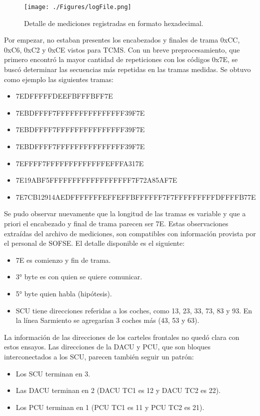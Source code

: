 \begin{figure}[H]
	\centering
	\texttt{[image: ./Figures/logFile.png]}
	\caption{Detalle de mediciones registradas en formato hexadecimal.}
	\label{fig:logFile}
\end{figure}

Por empezar, no estaban presentes los encabezados y finales de trama 0xCC, 0xC6, 0xC2 y 0xCE vistos para TCMS. Con un breve preprocesamiento, que primero encontró la mayor cantidad de repeticiones con los códigos 0x7E, se buscó determinar las secuencias más repetidas en las tramas medidas. Se obtuvo como ejemplo las siguientes tramas:

\begin{itemize}
\item 7EDFFFFFDEEFBFFFBFF7E
\item 7EBDFFFF7FFFFFFFFFFFFFFF39F7E
\item 7EBDFFFF7FFFFFFFFFFFFFFF39F7E
\item 7EBDFFFF7FFFFFFFFFFFFFFF39F7E
\item 7EFFFF7FFFFFFFFFFFFFEFFFA317E
\item 7E19ABF5FFFFFFFFFFFFFFFFFF7F72A85AF7E
\item 7E7CB12914AEDFFFFFFFEFFEFFBFFFFFF7F7FFFFFFFFFDFFFFB77E
\end{itemize}

Se pudo observar nuevamente que la longitud de las tramas es variable y que a priori el encabezado y final de trama parecen ser 7E. Estas observaciones extraídas del archivo de mediciones, son compatibles con información provista por el personal de SOFSE. El detalle disponible es el siguiente:

\begin{itemize}
\item 7E es comienzo y fin de trama.
\item  3° byte es con quien se quiere comunicar. 
\item  5° byte quien habla (hipótesis).
\item  SCU tiene direcciones referidas a los coches, como 13, 23, 33, 73, 83 y 93. En la línea Sarmiento se agregarían 3 coches más (43, 53 y 63).
\end{itemize}

La información de las direcciones de los carteles frontales no quedó clara con estos ensayos. Las direcciones de la DACU y PCU, que son bloques interconectados a los SCU, parecen también seguir un patrón:

\begin{itemize}
\item Los SCU terminan en 3.
\item Las DACU terminan en 2 (DACU TC1 es 12 y DACU TC2 es 22).
\item Los PCU terminan en 1 (PCU TC1 es 11 y PCU TC2 es 21).
\end{itemize}

